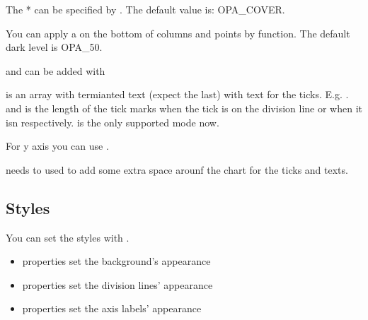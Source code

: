 \documentclass[letterpaper,10pt,english]{sphinxmanual}
\begin{document}
The * can be specified by . The default value is: OPA\_COVER.

You can apply a  on the bottom of columns and points by  function. The default dark level is OPA\_50.

 and  can be added with

\begin{sphinxVerbatim}[commandchars=\\\{\}]
   
                       
\end{sphinxVerbatim}

 is an array with   termianted text (expect the last) with text for the ticks. E.g. .
 and  is the length of the tick marks when the tick is on the division line or when it isn respectively.  is the only supported mode now.

For y axis you can use .

 needs to used to add some extra space arounf the chart for the ticks and texts.


\subsection{Styles}
\label{\detokenize{object-types/chart:styles}}
You can set the styles with .
\begin{itemize}
\item {} 
 properties set the background’s appearance

\item {} 
 properties set the division lines’ appearance

\item {} 
 properties set the axis labels’ appearance

\end{itemize}
\end{document}
